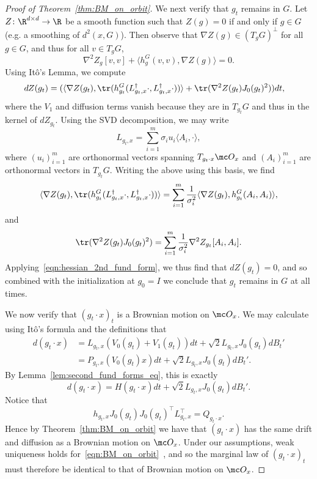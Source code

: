 \documentclass[twoside,a4paper,11pt]{article}
\theoremstyle{plain}
\begin{document}
\begin{proof}[Proof of Theorem~\ref{thm:BM_on_orbit}]
We next verify that $g_t$ remains in $G$.
Let
$Z \colon \R^{d \times d} \to \R$ be a smooth function such that $Z(g) = 0$ if and only
if $g \in G$ (e.g. a smoothing of 
$d^2(x,G)$). Then observe that $\nabla Z(g) \in (T_gG)^{\perp}$ for all $g \in G$, and thus for all $v \in T_gG$,
\begin{equation}\label{eqn:hessian_2nd_fund_form}
\nabla^2 Z_g[v, v] + \langle h^G_g(v, v), \nabla Z(g) \rangle = 0.
\end{equation}
Using Itô's Lemma, we compute
\begin{align*}
dZ(g_t) &= (\langle \nabla Z(g_t), \tr(h_{g_t}^G(L^{\dagger}_{g_t, x}\cdot, L^{\dagger}_{g_t, x}\cdot)) \rangle + \tr(\nabla^2 Z(g_t) J_0(g_t)^2))dt,
\end{align*} where the $V_1$ and diffusion terms vanish because they
are in $T_{g_t}G$ and thus in the kernel of $dZ_{g_t}$. 
Using the SVD decomposition, we may write
$$
L_{g_t, x} = \sum_{i=1}^m \sigma_i u_i \langle A_i, \cdot \rangle,
$$
where $(u_i)_{i =1}^m$ are orthonormal vectors spanning $T_{g_t \cdot x} \mc O_x$
and $(A_i)_{i = 1}^m$ are orthonormal vectors in $T_{g_t}G$. Writing the above
using this basis, we find
$$
\langle \nabla Z(g_t), \tr(h_{g_t}^G(L^{\dagger}_{g_t, x}\cdot, L^{\dagger}_{g_t, x}\cdot)) \rangle
= \sum_{i = 1}^m \frac{1}{\sigma_i^2}\langle \nabla Z(g_t), h^G_{g_t}(A_i, A_i) \rangle,
$$ and
$$
\tr(\nabla^2 Z(g_t) J_0(g_t)^2) = \sum_{i = 1}^m \frac{1}{\sigma_i^2}\nabla^2 Z_{g_t}[A_i,A_i].
$$ Applying~\eqref{eqn:hessian_2nd_fund_form}, we thus find that $dZ(g_t) = 0$, and so combined with the initialization
at $g_0 = I$ we conclude that $g_t$ remains in $G$ at all times.

We now verify that $(g_t \cdot x)_t$
is a Brownian motion on 
$\mc O_x$.
We may
calculate using Itô's formula
and the definitions that
\begin{align*}
d(g_t \cdot x)
&=L_{g_t, x}(V_0(g_t) + V_1(g_t))
dt + \sqrt{2}L_{g_t, x}J_0(g_t)
dB_t' \\
&=P_{g_t, x}(V_0(g_t)x)dt
+\sqrt{2}L_{g_t, x}J_0(g_t)dB_t'.
\end{align*}
By Lemma~\ref{lem:second_fund_forms_eq},
this is exactly
$$
d(g_t \cdot x)
= H(g_t \cdot x)dt + \sqrt{2}L_{g_t, x}J_0(g_t)dB_t'.
$$
Notice that
$$
h_{g_t, x}J_0(g_t)J_0(g_t)^\top L_{g_t, x}^\top
= Q_{g_t\cdot x}.
$$ Hence by Theorem~\ref{thm:BM_on_orbit}
we have that $(g_t \cdot x)$ has the same
drift and diffusion as a Brownian
motion on $\mc O_x$.
Under our assumptions, weak uniqueness
holds for~\eqref{eqn:BM_on_orbit}~\cite[Theorem 9.4.3]{bogachev2022fokker},
and so
the marginal law of $(g_t \cdot x)_t$ must therefore
be identical to that of Brownian motion on $\mc O_x$.
\end{proof} 
\end{document}
